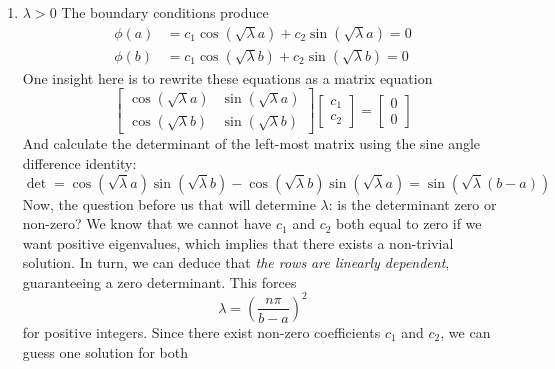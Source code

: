 \documentclass[a4paper]{article}
\begin{document}
\begin{enumerate}[label=(\alph*)]
	\underline{\( \lambda < 0 \)}
	Let \( s = -\lambda \). The boundary conditions produce
	\begin{alignat*}{2}
		\frac{d \phi}{d x}\!\left( 0 \right) & = c_{2}\sqrt{s} = 0 \quad && \implies c_{2} = 0 \\
		\phi \!\left( L \right) & = c_{1}\cosh\!\left(\sqrt{s}L\right) = 0 \quad && \implies c_{1} = 0
	\end{alignat*}
	once more indicating that the trivial solution is all that is yielded, ensuring that \( \lambda < 0  \) can never be eigenvalues of the boundary value problem.
	\item \underline{\( \lambda > 0 \)}
	The boundary conditions produce
	\begin{align*}
		\phi \!\left( a \right) & = c_{1}\cos\!\left(\sqrt{\lambda}a\right) + c_{2}\sin\!\left(\sqrt{\lambda}a\right) = 0 \\
		\phi \!\left( b \right) & = c_{1}\cos\!\left(\sqrt{\lambda}b\right) + c_{2}\sin\!\left(\sqrt{\lambda}b\right) = 0
	\end{align*}
	One insight here is to rewrite these equations as a matrix equation
	\[
		\begin{bmatrix}
			\cos\!\left(\sqrt{\lambda}a\right) & \sin\!\left(\sqrt{\lambda}a\right)\\[6pt]
			\cos\!\left(\sqrt{\lambda}b\right) & \sin\!\left(\sqrt{\lambda}b\right)
		\end{bmatrix}
		\begin{bmatrix}
			c_{1} \\
			c_{2}
		\end{bmatrix}
		=
		\begin{bmatrix}
			0 \\
			0
		\end{bmatrix}
	\]
	And calculate the determinant of the left-most matrix using the sine angle difference identity:
	\[
		\det = \cos\!\left(\sqrt{\lambda}a\right)\sin\!\left(\sqrt{\lambda}b\right) - \cos\!\left(\sqrt{\lambda}b\right)\sin\!\left(\sqrt{\lambda}a\right) = \sin\!\left(\sqrt{\lambda}\!\left( b - a \right)\right) 
	\]
	Now, the question before us that will determine \( \lambda \): is the determinant zero or non-zero? We know that we cannot have \( c_{1} \) and \( c_{2} \) both equal to zero if we want positive eigenvalues, which implies that there exists a non-trivial solution. In turn, we can deduce that \textit{the rows are linearly dependent}, guaranteeing a zero determinant. This forces
	\[
		\lambda = \!\left( \frac{n \pi}{b - a} \right)^{2} 
	\]
	for positive integers. Since there exist non-zero coefficients \( c_{1} \) and \( c_{2} \), we can guess one solution for both

\end{enumerate}
\end{document}
